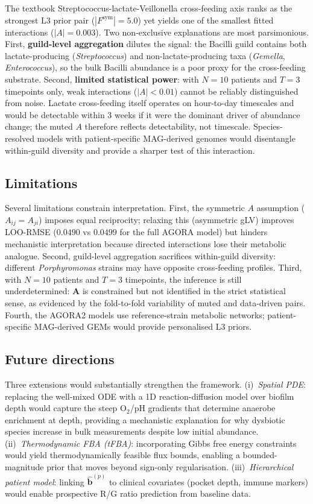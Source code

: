 \documentclass[11pt,a4paper]{article}
\newcommand{\bA}{\mathbf{A}}
\newcommand{\bb}{\mathbf{b}}
\begin{document}
The textbook Streptococcus-lactate-Veillonella cross-feeding axis ranks as
the strongest L3 prior pair ($|F^\text{sym}| = 5.0$) yet yields one of the
smallest fitted interactions ($|A| = 0.003$).
Two non-exclusive explanations are most parsimonious.
First, \textbf{guild-level aggregation} dilutes the signal: the Bacilli
guild contains both lactate-producing (\textit{Streptococcus}) and
non-lactate-producing taxa (\textit{Gemella}, \textit{Enterococcus}),
so the bulk Bacilli abundance is a poor proxy for the cross-feeding
substrate.
Second, \textbf{limited statistical power}: with $N{=}10$ patients and
$T{=}3$ timepoints only, weak interactions ($|A|<0.01$) cannot be
reliably distinguished from noise.
Lactate cross-feeding itself operates on hour-to-day timescales and
would be detectable within 3 weeks if it were the dominant driver of
abundance change; the muted $A$ therefore reflects detectability, not
timescale.
Species-resolved models with patient-specific MAG-derived genomes would
disentangle within-guild diversity and provide a sharper test of this
interaction.

\subsection{Limitations}

Several limitations constrain interpretation.
First, the symmetric $A$ assumption ($A_{ij} = A_{ji}$) imposes equal
reciprocity; relaxing this (asymmetric gLV) improves LOO-RMSE ($0.0490$ vs
$0.0499$ for the full AGORA model) but hinders mechanistic interpretation
because directed interactions lose their metabolic analogue.
Second, guild-level aggregation sacrifices within-guild diversity: different
\textit{Porphyromonas} strains may have opposite cross-feeding profiles.
Third, with $N{=}10$ patients and $T{=}3$ timepoints, the inference is
still underdetermined: $\bA$ is constrained but not identified in the
strict statistical sense, as evidenced by the fold-to-fold variability
of muted and data-driven pairs.
Fourth, the AGORA2 models use reference-strain metabolic networks; patient-specific
MAG-derived GEMs would provide personalised L3 priors.

\subsection{Future directions}

Three extensions would substantially strengthen the framework.
(i)~\textit{Spatial PDE}: replacing the well-mixed ODE with a 1D
reaction-diffusion model over biofilm depth would capture the steep
O$_2$/pH gradients that determine anaerobe enrichment at depth,
providing a mechanistic explanation for why dysbiotic species increase
in bulk measurements despite low initial abundance.
(ii)~\textit{Thermodynamic FBA (tFBA)}: incorporating Gibbs free energy
constraints would yield thermodynamically feasible flux bounds, enabling
a bounded-magnitude prior that moves beyond sign-only regularisation.
(iii)~\textit{Hierarchical patient model}: linking $\hat{\bb}^{(p)}$ to
clinical covariates (pocket depth, immune markers) would enable prospective
R/G ratio prediction from baseline data.
\end{document}

